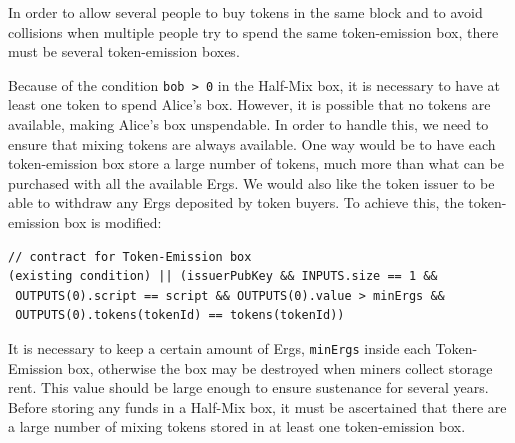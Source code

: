 \documentclass[11pt]{article}
\newcommand{\ignore}[1]{}
\begin{document}
In order to allow several people to buy tokens in the same block and to avoid collisions when multiple people try to spend the same token-emission box, there must be several token-emission boxes. 

Because of the condition \texttt{bob > 0} in the Half-Mix box, it is necessary to have at least one token to spend Alice's box. However, it is possible that no tokens are available, making Alice's box unspendable. In order to handle this, we need to ensure that mixing tokens are always available. One way would be to have each token-emission box store a large number of tokens, much more than what can be purchased with all the available Ergs. We would also like the token issuer to be able to withdraw any Ergs deposited by token buyers. To achieve this, the token-emission box is modified:

\begin{Verbatim}[frame=single]
// contract for Token-Emission box
(existing condition) || (issuerPubKey && INPUTS.size == 1 && 
 OUTPUTS(0).script == script && OUTPUTS(0).value > minErgs &&
 OUTPUTS(0).tokens(tokenId) == tokens(tokenId))
\end{Verbatim}

It is necessary to keep a certain amount of Ergs, \texttt{minErgs} inside each Token-Emission box, otherwise the box may be destroyed when miners collect storage rent. This value should be large enough to ensure sustenance for several years. Before storing any funds in a Half-Mix box, it must be ascertained that there are a large number of mixing tokens stored in at least one token-emission box. 
\ignore{
\textbf{First Spender Pays Fee:} Another enhancement, primarily in perfect fairness, is to benefit the party that is willing to wait longer. We then require that the fee for the mix transaction be paid by the first party that spends an output. We can identify the first spender as follows. 

Firstly, the protocol is modified to require that each mix transaction to generate exactly 4 quantities of a new secondary token (with id $x$, determined as the id of the first input -- the Half-Mix box) distributed equally among 4 outputs. Two of these outputs are the standard mix outputs $O_0, O_1$ with the additional spending condition that one output must contain some non-zero quantity of token $x$. The other two outputs, $O_2, O_3$, have the following identical spending conditions:
\begin{enumerate}
	\item The sum of quantities of token $x$ in the inputs and outputs is 3 and 2 respectively.
	\item One output contains 2 quantities of token $x$ protected by the same script as this box. 
\end{enumerate}

It can be checked that the current spender is the second spender if and only if there is an input with two quantities of token $x$. The script also ensures that the first spender must create a new box with two tokens that can only be used by the second spender.
}
\end{document}
